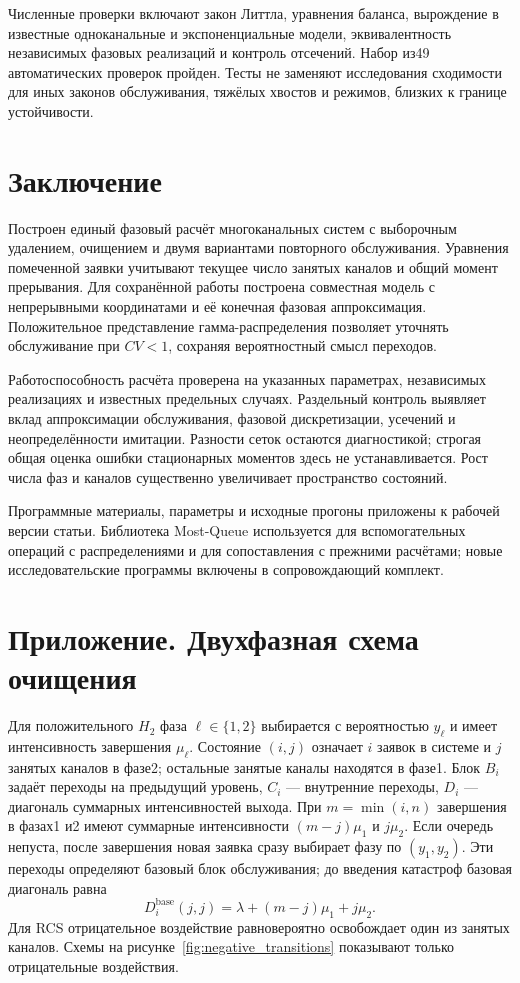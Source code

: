 Численные проверки включают закон Литтла, уравнения баланса, вырождение в известные одноканальные и экспоненциальные модели, эквивалентность независимых фазовых реализаций и контроль отсечений. Набор из49 автоматических проверок пройден. Тесты не заменяют исследования сходимости для иных законов обслуживания, тяжёлых хвостов и режимов, близких к границе устойчивости.

\section{Заключение}
Построен единый фазовый расчёт многоканальных систем с выборочным удалением, очищением и двумя вариантами повторного обслуживания. Уравнения помеченной заявки учитывают текущее число занятых каналов и общий момент прерывания. Для сохранённой работы построена совместная модель с непрерывными координатами и её конечная фазовая аппроксимация. Положительное представление гамма-распределения позволяет уточнять обслуживание при \(CV<1\), сохраняя вероятностный смысл переходов.

Работоспособность расчёта проверена на указанных параметрах, независимых реализациях и известных предельных случаях. Раздельный контроль выявляет вклад аппроксимации обслуживания, фазовой дискретизации, усечений и неопределённости имитации. Разности сеток остаются диагностикой; строгая общая оценка ошибки стационарных моментов здесь не устанавливается. Рост числа фаз и каналов существенно увеличивает пространство состояний.

Программные материалы, параметры и исходные прогоны приложены к рабочей версии статьи. Библиотека Most-Queue \cite{mostqueue2026} используется для вспомогательных операций с распределениями и для сопоставления с прежними расчётами; новые исследовательские программы включены в сопровождающий комплект.

\clearpage
\section*{Приложение. Двухфазная схема очищения}
Для положительного \(H_2\) фаза \(\ell\in\{1,2\}\) выбирается с вероятностью \(y_\ell\) и имеет интенсивность завершения \(\mu_\ell\). Состояние \((i,j)\) означает \(i\) заявок в системе и \(j\) занятых каналов в фазе2; остальные занятые каналы находятся в фазе1. Блок \(B_i\) задаёт переходы на предыдущий уровень, \(C_i\) --- внутренние переходы, \(D_i\) --- диагональ суммарных интенсивностей выхода. При \(m=\min(i,n)\) завершения в фазах1 и2 имеют суммарные интенсивности \((m-j)\mu_1\) и \(j\mu_2\). Если очередь непуста, после завершения новая заявка сразу выбирает фазу по \((y_1,y_2)\). Эти переходы определяют базовый блок обслуживания; до введения катастроф базовая диагональ равна
\[
D_i^{\mathrm{base}}(j,j)=\lambda+(m-j)\mu_1+j\mu_2.
\]
Для RCS отрицательное воздействие равновероятно освобождает один из занятых каналов. Схемы на рисунке~\ref{fig:negative_transitions} показывают только отрицательные воздействия.


